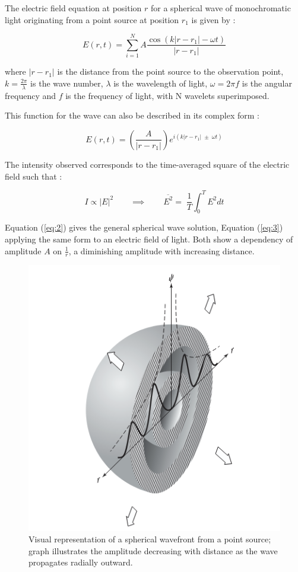 \documentclass[12pt]{article}
\begin{document}
The electric field equation  at position \( r \) for a spherical wave of monochromatic light originating from a point source at position \( r_1 \) is given by \cite{reportguide7}:

\begin{equation} \label{eq:3}
    E(r,t) = \sum_{i=1}^N A \frac{\cos(k \lvert r-r_1 \rvert - \omega t)}{\lvert r - r_1 \rvert}
\end{equation}

where \( \lvert r - r_1 \rvert \) is the distance from the point source to the observation point, \( k = \frac{2\pi}{\lambda} \) is the wave number, \( \lambda \) is the wavelength of light, \( \omega = 2\pi f \) is the angular frequency and \( f \) is the frequency of light, with N wavelets superimposed. \cite{reportguide7}

This function for the wave can also be described in its complex form \cite{hecht2012optics}:

\begin{equation}\label{eq:4}
    E(r,t) = \left( \frac{A}{\lvert r-r_1 \rvert} \right) e^{i(k\lvert r -r_1 \rvert \;\pm\; \omega t)}
\end{equation}

The intensity observed corresponds to the time-averaged square of the electric field such that \cite{reportguide7}:

\begin{equation} \label{eq:5}
    I \propto \lvert E \rvert^2 \qquad \implies \qquad \overline{E^2} = \; \frac{1}{T} \int_0^T E^2 dt
\end{equation}

Equation (\ref{eq:2}) gives the general spherical wave solution, Equation (\ref{eq:3}) applying the same form to an electric field of light. Both show a dependency of amplitude \( A \) on \( \frac{1}{r} \), a diminishing amplitude with increasing distance.

\vspace{-2em}
\begin{figure}[H]
    \centering
    \includegraphics[width=.45\textwidth]{SphericalWavefront.png}
    \caption{Visual representation of a spherical wavefront from a point source; graph illustrates the amplitude decreasing with distance as the wave propagates radially outward. \cite{hecht2012optics}}
    \label{fig:1}
\end{figure}
\end{document}
